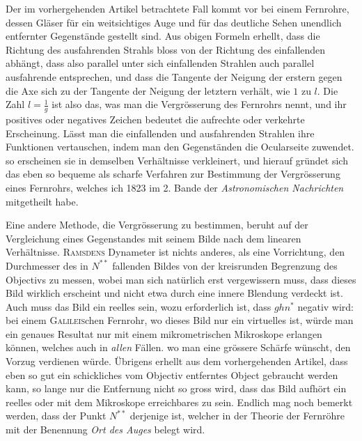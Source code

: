 Der im vorhergehenden Artikel betrachtete Fall kommt vor bei einem Fernrohre, dessen Gläser für ein weitsichtiges Auge und für das deutliche Sehen unendlich entfernter Gegenstände gestellt sind. Aus obigen Formeln erhellt, dass die Richtung des ausfahrenden Strahls bloss von der Richtung des einfallenden abhängt, dass also parallel unter sich einfallenden Strahlen auch parallel ausfahrende entsprechen, und dass die Tangente der Neigung der erstern gegen die Axe sich zu der Tangente der Neigung der letztern verhält, wie $1$ zu $l$. Die Zahl $l=\frac1g$ ist also das, was man die Vergrösserung des Fernrohrs nennt, und ihr positives oder negatives Zeichen bedeutet die aufrechte oder verkehrte Erscheinung. Lässt man die einfallenden und ausfahrenden Strahlen ihre Funktionen vertauschen, indem man den Gegenständen die Ocularseite zuwendet. so erscheinen sie in demselben Verhältnisse verkleinert, und hierauf gründet sich das eben so bequeme als scharfe Verfahren zur Bestimmung der Vergrösserung eines Fernrohrs, welches ich 1823 im 2. Bande der \textit{Astronomischen Nachrichten} mitgetheilt habe.

Eine andere Methode, die Vergrösserung zu bestimmen, beruht auf der Vergleichung eines Gegenstandes mit seinem Bilde nach dem linearen Verhältnisse. \textsc{Ramsdens} Dynameter ist nichts anderes, als eine Vorrichtung, den Durchmesser des in $N^{**}$ fallenden Bildes von der kreisrunden Begrenzung des Objectivs zu messen, wobei man sich natürlich erst vergewissern muss, dass dieses Bild wirklich erscheint und nicht etwa durch eine innere Blendung verdeckt ist. Auch muss das Bild ein reelles sein, wozu erforderlich ist, dass $ghn^*$ negativ wird: bei einem \textsc{Galileis}chen Fernrohr, wo dieses Bild nur ein virtuelles ist, würde man ein genaues Resultat nur mit einem mikrometrischen Mikroskope erlangen können, welches auch in \textit{allen} Fällen. wo man eine grössere Schärfe wünscht, den Vorzug verdienen würde. Übrigens erhellt aus dem vorhergehenden Artikel, dass eben so gut ein schickliches vom Objectiv entferntes Object gebraucht werden kann, so lange nur die Entfernung nicht so gross wird, dass das Bild aufhört ein reelles oder mit dem Mikroskope erreichbares zu sein. Endlich mag noch bemerkt werden, dass der Punkt $N^{**}$ derjenige ist, welcher in der Theorie der Fernröhre mit der Benennung \textit{Ort des Auges} belegt wird.

